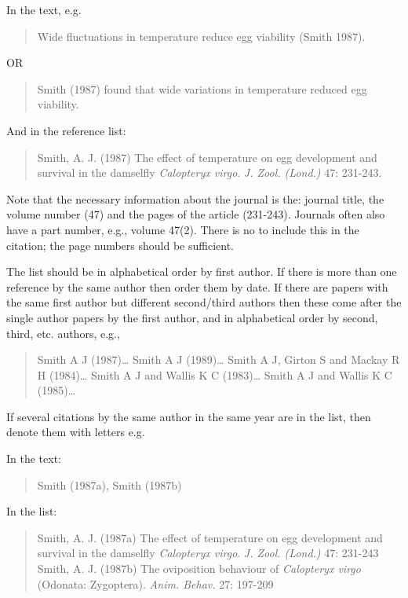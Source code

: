 \documentclass[
]{book}
\begin{document}
In the text, e.g.

\begin{quote}
Wide fluctuations in temperature reduce egg viability (Smith 1987).
\end{quote}

OR

\begin{quote}
Smith (1987) found that wide variations in temperature reduced egg viability.
\end{quote}

And in the reference list:

\begin{quote}
Smith, A. J. (1987) The effect of temperature on egg development and survival in the damselfly \emph{Calopteryx virgo}. \emph{J. Zool. (Lond.)} 47: 231-243.
\end{quote}

Note that the necessary information about the journal is the: journal title, the volume number (47) and the pages of the article (231-243). Journals often also have a part number, e.g., volume 47(2). There is no to include this in the citation; the page numbers should be sufficient.

The list should be in alphabetical order by first author. If there is more than one reference by the same author then order them by date. If there are papers with the same first author but different second/third authors then these come after the single author papers by the first author, and in alphabetical order by second, third, etc. authors, e.g.,

\begin{quote}
Smith A J (1987)\ldots{} Smith A J (1989)\ldots{} Smith A J, Girton S and Mackay R H (1984)\ldots{} Smith A J and Wallis K C (1983)\ldots{} Smith A J and Wallis K C (1985)\ldots{}
\end{quote}

If several citations by the same author in the same year are in the list, then denote them with letters e.g.

In the text:

\begin{quote}
Smith (1987a), Smith (1987b)
\end{quote}

In the list:

\begin{quote}
Smith, A. J. (1987a) The effect of temperature on egg development and survival in the damselfly \emph{Calopteryx virgo}. \emph{J. Zool. (Lond.)} 47: 231-243 Smith, A. J. (1987b) The oviposition behaviour of \emph{Calopteryx virgo} (Odonata: Zygoptera). \emph{Anim. Behav.} 27: 197-209
\end{quote}
\end{document}
